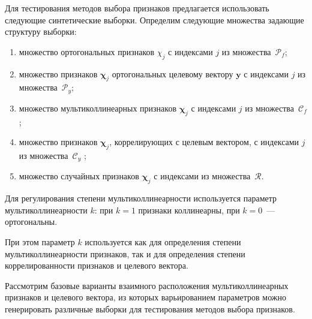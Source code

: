 \documentclass[a4paper,12pt]{article}
\newcommand{\by}{\mathbf{y}}
\newcommand{\bchi}{\boldsymbol{\chi}}
\newcommand{\calC}{\mathcal{C}}
\newcommand{\calP}{\mathcal{P}}
\newcommand{\calR}{\mathcal{R}}
\begin{document}
Для тестирования методов выбора признаков предлагается использовать следующие синтетические выборки. Определим следующие множества задающие структуру выборки: 
\begin{enumerate}[1)]
\item множество ортогональных признаков $\chi_j$ с индексами $j$ из множества~$\calP_f$;
\item множество признаков $\bchi_j$ ортогональных целевому вектору $\by$ с индексами $j$ из множества~$\calP_y$;
\item множество мультиколлинеарных признаков $\bchi_j$ с индексами $j$ из множества~$\calC_f$;
\item множество признаков $\bchi_j$, коррелирующих с целевым вектором, с индексами $j$ из множества~$\calC_y$ ;
\item множество случайных признаков $\bchi_j$ с индексами из множества~$\calR$.    
\end{enumerate}

Для регулирования степени  мультиколлинеарности используется параметр мультиколлинеарности $k$: при $k = 1$ признаки коллинеарны, при $k = 0$~--- ортогональны. 

При этом параметр $k$ используется как для определения степени мультиколлинеарности признаков, так и для определения степени коррелированности признаков и целевого вектора.

Рассмотрим базовые варианты взаимного расположения мультиколлинеарных признаков и целевого вектора, из которых варьированием параметров можно генерировать различные выборки для тестирования методов выбора признаков.
\end{document}
